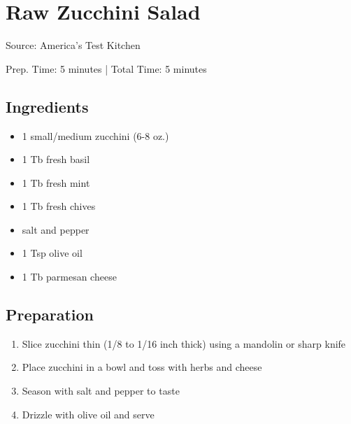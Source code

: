 \section{Raw Zucchini Salad}

Source: America's Test Kitchen

\begin{center}
Prep. Time: 5 minutes |
Total Time: 5 minutes
\end{center}

\subsection{Ingredients}
\begin{itemize}
    \item 1 small/medium zucchini (6-8 oz.)
    \item 1 Tb fresh basil
    \item 1 Tb fresh mint
    \item 1 Tb fresh chives
    \item salt and pepper
    \item 1 Tsp olive oil
    \item 1 Tb parmesan cheese
\end{itemize}

\subsection{Preparation}
\begin{enumerate}
    \item Slice zucchini thin (1/8 to 1/16 inch thick) using a mandolin or sharp knife
    \item Place zucchini in a bowl and toss with herbs and cheese
    \item Season with salt and pepper to taste
    \item Drizzle with olive oil and serve
\end{enumerate}

